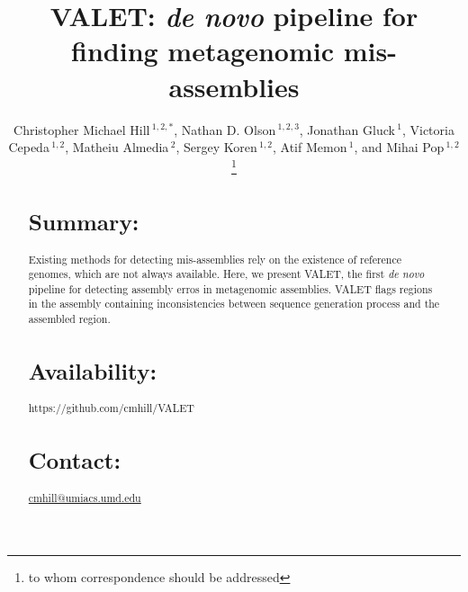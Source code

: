 \documentclass{bioinfo}
\begin{document}

\title[VALET]{VALET: \emph{de novo} pipeline for finding metagenomic mis-assemblies}
\author[Hill \textit{et~al}]{Christopher Michael Hill\,$^{1,2,*}$, Nathan D. Olson\,$^{1,2,3}$, Jonathan Gluck\,$^{1}$, Victoria Cepeda\,$^{1,2}$, Matheiu Almedia\,$^{2}$, Sergey Koren\,$^{1,2}$, Atif Memon\,$^{1}$, and Mihai Pop\,$^{1,2}$\footnote{to whom correspondence should be addressed}}
\address{
$^{1}$Department of Computer Science,
University of Maryland, College Park, Maryland, 20742
USA\\ 
$^{2}$ Center for Bioinformatics and Computational Biology, 
University of Maryland, College Park, Maryland, 20742 USA.\\
$^{3}$ Biosystems and Biomaterials Division, Material Measurement Laboratory
 National Institute of Standards and Technology, Gaithersburg, Maryland, 20899 USA
}




\maketitle

\begin{abstract}

\section{Summary:}
Existing methods for detecting mis-assemblies rely on the existence of reference genomes, which are not always available.
Here, we present VALET, the first \emph{de novo} pipeline for detecting assembly erros in metagenomic assemblies.
VALET flags regions in the assembly containing inconsistencies between sequence generation process and the assembled region.
\section{Availability:}
https://github.com/cmhill/VALET
\section{Contact:} \href{cmhill@umiacs.umd.edu}{cmhill@umiacs.umd.edu}
\end{abstract}
\end{document}
